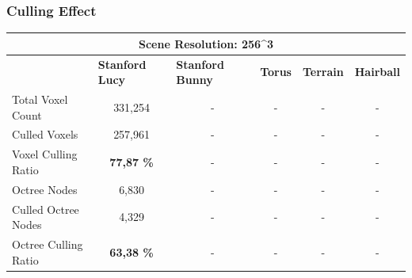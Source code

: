 \subsubsection*{Culling Effect}

\begin{table}[h]
    \begin{tabular}{|lccccc|}
    \hline
    \multicolumn{6}{|c|}{\textbf{Scene Resolution: 256\textasciicircum{}3}}                                                                                                                                                                                                         \\ \hline
    \multicolumn{1}{|l|}{}                          & \multicolumn{1}{|l|}{\textbf{Stanford Lucy}}  & \multicolumn{1}{l|}{\textbf{Stanford Bunny}}  & \multicolumn{1}{l|}{\textbf{Torus}}   & \multicolumn{1}{l|}{\textbf{Terrain}}     & \multicolumn{1}{l|}{\textbf{Hairball}}    \\ \hline
    \multicolumn{1}{|l|}{Total Voxel Count}         & \multicolumn{1}{c|}{331,254}                  & \multicolumn{1}{c|}{-}                        & \multicolumn{1}{c|}{-}                & \multicolumn{1}{c|}{-}                    & \multicolumn{1}{c|}{-}                    \\
    \multicolumn{1}{|l|}{Culled Voxels}             & \multicolumn{1}{c|}{257,961}                  & \multicolumn{1}{c|}{-}                        & \multicolumn{1}{c|}{-}                & \multicolumn{1}{c|}{-}                    & -                                         \\
    \multicolumn{1}{|l|}{Voxel Culling Ratio}       & \multicolumn{1}{c|}{\textbf{77,87 \%}}        & \multicolumn{1}{c|}{-}                        & \multicolumn{1}{c|}{-}                & \multicolumn{1}{c|}{-}                    & -                                         \\ \hline
    \multicolumn{1}{|l|}{Octree Nodes}              & \multicolumn{1}{c|}{6,830}                    & \multicolumn{1}{c|}{-}                        & \multicolumn{1}{c|}{-}                & \multicolumn{1}{c|}{-}                    & -                                         \\
    \multicolumn{1}{|l|}{Culled Octree Nodes}       & \multicolumn{1}{c|}{4,329}                    & \multicolumn{1}{c|}{-}                        & \multicolumn{1}{c|}{-}                & \multicolumn{1}{c|}{-}                    & -                                         \\
    \multicolumn{1}{|l|}{Octree Culling Ratio}      & \multicolumn{1}{c|}{\textbf{63,38 \%}}        & \multicolumn{1}{c|}{-}                        & \multicolumn{1}{c|}{-}                & \multicolumn{1}{c|}{-}                    & -                                         \\ \hline
    \end{tabular}
\end{table}


